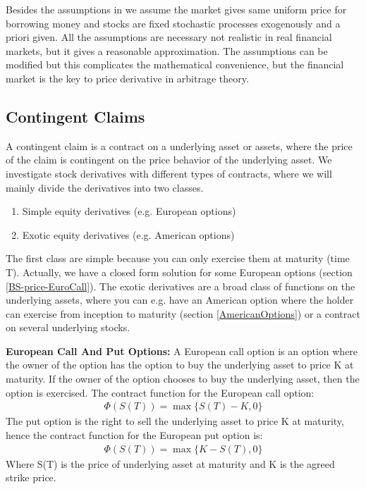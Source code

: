 Besides the assumptions in \parencite{finKont} we assume the market gives same uniform price for borrowing money and stocks are fixed stochastic processes exogenously and a priori given. All the assumptions are necessary not realistic in real financial markets, but it gives a reasonable approximation. The assumptions can be modified but this complicates the mathematical convenience, but the financial market is the key to price derivative in arbitrage theory.


\subsection{Contingent Claims}
A contingent claim is a contract on a underlying asset or assets, where the price of the claim is contingent on the price behavior of the underlying asset. We investigate stock derivatives with different types of contracts, where we will mainly divide the derivatives into two classes. 
\begin{enumerate}
\item Simple equity derivatives (e.g. European options)
\item Exotic equity derivatives (e.g. American options)
\end{enumerate}
The first class are simple because you can only exercise them at maturity (time T). Actually, we have a closed form solution for some European options (section \ref{BS-price-EuroCall}). The exotic derivatives are a broad class of functions on the underlying assets, where you can e.g. have an American option where the holder can exercise from inception to maturity (section \ref{AmericanOptions}) or a contract on several underlying stocks.

\theoremstyle{definition}
\begin{definition}{\textbf{European Call And Put Options:}}\label{def:CallOptions}
A European call option is an option where the owner of the option has the option to buy the underlying asset to price K at maturity. If the owner of the option chooses to buy the underlying asset, then the option is exercised. The contract function for the European call option:
\begin{equation*}
\begin{split}
\Phi(S(T))=\max\{S(T)-K, 0\}
\end{split}
\end{equation*}
The put option is the right to sell the underlying asset to price K at maturity, hence the contract function for the European put option is:
\begin{equation*}
\begin{split}
\Phi(S(T))=\max\{K-S(T), 0\}
\end{split}
\end{equation*}
Where S(T) is the price of underlying asset at maturity and K is the agreed strike price.
\end{definition}

